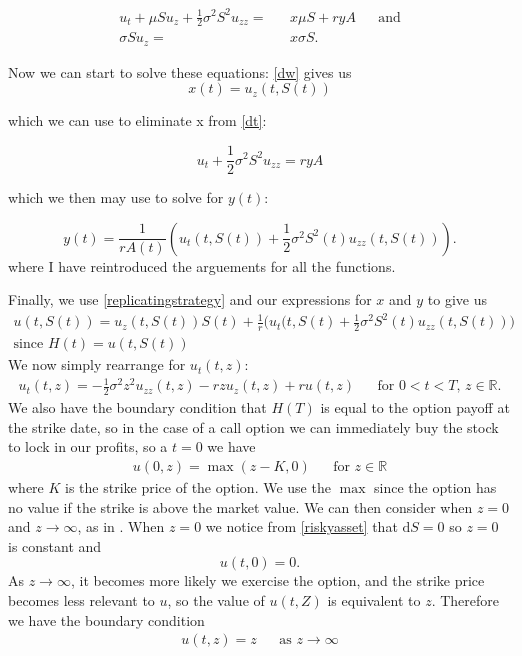 \documentclass[11pt]{article} %
\begin{document}
\begin{align}\label{dt}
    u_t + \mu S u_z + \frac{1}{2} \sigma^2 S^2 u_{zz}  = &&x\mu S + ryA &&\text{and} \\
    \sigma Su_z =&& x\sigma S.\label{dw}
\end{align}

Now we can start to solve these equations: \ref{dw} gives us
\begin{equation}
    x(t) = u_z(t,S(t))
\end{equation}

which we can use to eliminate x from \ref{dt}:

\begin{equation}
    u_t + \frac{1}{2}\sigma ^2 S^2u_{zz} = ryA
\end{equation}

which we then may use to solve for $y(t)$:

\begin{equation}
    y(t) = \frac{1}{rA(t)}(u_t(t,S(t)) + \frac{1}{2} \sigma^2S^2(t)u_{zz}(t,S(t)) ).
\end{equation}
where I have reintroduced the arguements for all the functions.

Finally, we use \ref{replicatingstrategy} and our expressions for $x$ and $y$ to give us
\begin{align}
    u(t,S(t)) = u_z(t,S(t))S(t) + \frac{1}{r}\bigg(u_t(t,S(t) + \frac{1}{2}\sigma^2S^2(t)
    u_{zz}(t,S(t))\bigg) \\\text{since $H(t) = u(t,S(t))$}
\end{align}
We now simply rearrange for $u_t(t,z)$:
\begin{align}\label{blackscholes}
    u_t(t,z) = -\frac{1}{2}\sigma^2z^2u_{zz}(t,z) - rzu_z(t,z) + ru(t,z) 
   && \text{for $0<t<T$, $z \in \mathbb{R}$.}
\end{align}
We also have the boundary condition that $H(T)$ is equal to the option payoff at the strike 
date, so in the case of a call option we can immediately buy the stock to lock in our profits, 
so a $t=0$ we have
\begin{align} \label{initialvalue}
    u(0,z) = \max{(z - K , 0)} && \text{for $z \in \mathbb{R}$}
\end{align}
where $K$ is the strike price of the option. We use the $\max$ since the option has no value 
if the strike is above the market value. We can then consider when $z=0$ and 
$z \to \infty$, as in \cite{scholesapplication}. When $z=0$ we notice from \ref{riskyasset} 
that $\mathrm{d}S = 0$ so $z = 0$ is constant and
\begin{equation} \label{boundarycondition}
    u(t,0) = 0.
\end{equation}
As $z \to \infty$, it becomes more likely we exercise the option, and the strike price 
becomes less relevant to $u$, so the value of $u(t,Z)$ is equivalent to $z$. Therefore 
we have the boundary condition 
\begin{align} 
    u(t,z) = z && \text{as $z \to \infty$}
\end{align}
\end{document}
